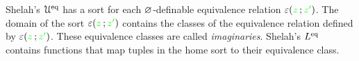 \documentclass[creche.tex]{subfiles}
\begin{document}
Shelah's $\EuScript U^{{\rm eq}}$ has a sort for each $\varnothing$-definable equivalence relation $\varepsilon({\color{green} z}\,;{\color{green} z'})$.
The domain of the sort $\varepsilon({\color{green} z}\,;{\color{green} z'})$ contains the classes of the equivalence relation defined by $\varepsilon({\color{green} z}\,;{\color{green} z'})$.
These equivalence classes are called \emph{imaginaries}.
Shelah's $L^{{\rm eq}}$ contains functions that map tuples in the home sort to their equivalence class.

\end{document}
